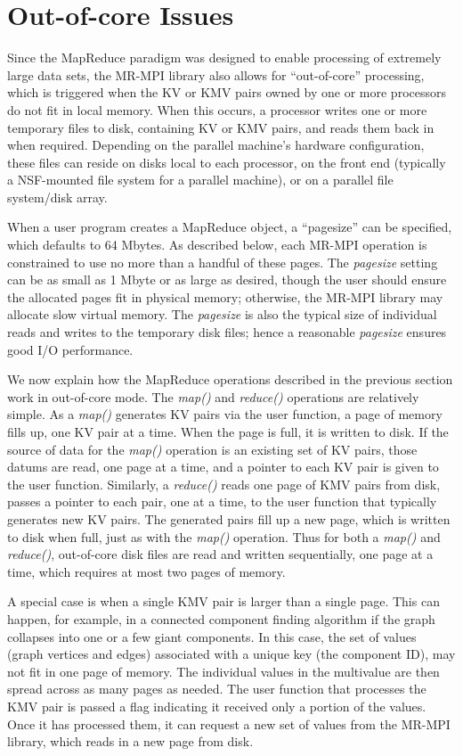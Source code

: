\section{Out-of-core Issues}
\label{sec:outcore}

Since the MapReduce paradigm was designed to enable processing of
extremely large data sets, the MR-MPI library also allows for
``out-of-core'' processing, which is triggered when the KV or KMV
pairs owned by one or more processors do not fit in local memory.
When this occurs, a processor writes one or more temporary files to
disk, containing KV or KMV pairs, and reads them back in when
required.  Depending on the parallel machine's hardware configuration,
these files can reside on disks local to each processor, on the front
end (typically a NSF-mounted file system for a parallel machine), or
on a parallel file system/disk array.

When a user program creates a MapReduce object, a ``pagesize'' can be
specified, which defaults to 64 Mbytes.  As described below, each
MR-MPI operation is constrained to use no more than a handful of
these pages.  The {\it pagesize} setting can be as small as 1 Mbyte or
as large as desired, though the user should ensure the allocated pages
fit in physical memory; otherwise, the MR-MPI library may allocate slow
virtual memory.  The {\it pagesize} is also the typical size of
individual reads and writes to the temporary disk files; hence a
reasonable {\it pagesize} ensures good I/O performance.

We now explain how the MapReduce operations described in the previous
section work in out-of-core mode.  The {\it map()} and {\it reduce()}
operations are relatively simple.  As a {\it map()} generates KV pairs
via the user function, a page of memory fills up, one KV pair at a
time.  When the page is full, it is written to disk.  If the source of
data for the {\it map()} operation is an existing set of KV pairs,
those datums are read, one page at a time, and a pointer to
each KV pair is given to the user function.  Similarly, a {\it
reduce()} reads one page of KMV pairs from disk, passes a pointer
to each pair, one at a time, to the user function that typically generates
new KV pairs.  The generated pairs fill up a new page, which is
written to disk when full, just as with the {\it map()} operation.
Thus for both a {\it map()} and {\it reduce()}, out-of-core disk files
are read and written sequentially, one page at a time, which requires
at most two pages of memory.

A special case is when a single KMV pair is larger than a single page.
This can happen, for example, in a connected component finding
algorithm if the graph collapses into one or a few giant components.
In this case, the set of values (graph vertices and edges) associated
with a unique key (the component ID), may not fit in one page of
memory.  The individual values in the multivalue are then spread
across as many pages as needed.  The user function that processes the
KMV pair is passed a flag indicating it received only a portion of the
values.  Once it has processed them, it can request a new set of
values from the MR-MPI library, which reads in a new page from disk.


